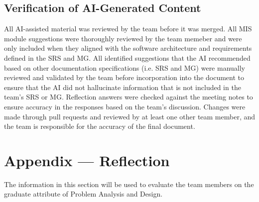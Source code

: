 \documentclass[12pt, titlepage]{article}
\begin{document}
\subsection{Verification of AI-Generated Content}

All AI-assisted material was reviewed by the team before it was merged. All 
MIS module suggestions were thoroughly reviewed by the team memeber and were 
only included when they aligned with the software architecture and requirements 
defined in the SRS and MG. All identified suggestions that the AI recommended 
based on other documentation specifications (i.e. SRS and MG) were manually 
reviewed and validated by the team before incorporation into the document to 
ensure that the AI did not hallucinate information that is not included in 
the team's SRS or MG. Reflection answers were checked against the meeting 
notes to ensure accuracy in the responses based on the team's discussion. 
Changes were made through pull requests and reviewed by at least one 
other team member, and the team is responsible for the accuracy of the final 
document.

\section{Appendix --- Reflection}

The information in this section will be used to evaluate the team members on the
graduate attribute of Problem Analysis and Design.


\end{document}
